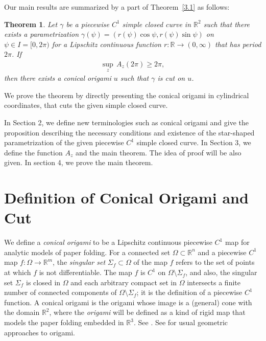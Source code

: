 \documentclass{amsart}
\theoremstyle{plain}
\newtheorem*{theorem*}{Theorem}
\theoremstyle{definition}
\theoremstyle{remark}
\begin{document}
Our main results are summarized by a part of Theorem~\ref{3.1} as follows:
\begin{theorem*} %
Let $\gamma$ be a piecewise $C^1$ simple closed curve in $\mathbb{R}^2$ such that there exists a parametrization $\gamma(\psi)=(r(\psi)\cos\psi,r(\psi)\sin\psi)$ on $\psi\in I=[0,2\pi)$ for a Lipschitz continuous function $r \colon \mathbb{R}\to(0,\infty)$ that has period $2\pi$. If
\begin{align}\label{condition}%
\sup_{z}\,A_z(2\pi)\ge2\pi,
\end{align}
then there exists a conical origami $u$ such that $\gamma$ is cut on $u$.
\end{theorem*}
\noindent We prove the theorem by directly presenting the conical origami in cylindrical coordinates, that cuts the given simple closed curve.

In Section 2, we define new terminologies such as conical origami and give the proposition describing the necessary conditions and existence of the star-shaped parametrization of the given piecewise $C^1$ simple closed curve.
In Section 3, we define the function $A_z$ and the main theorem.
The idea of proof will be also given.
In section 4, we prove the main theorem.






\bigskip

\section{Definition of Conical Origami and Cut}%
We define a \emph{conical origami} to be a Lipschitz continuous piecewise $C^1$ map for analytic models of paper folding.
For a connected set $\Omega\subset\mathbb{R}^n$ and a piecewise $C^1$ map $f\colon\Omega\to\mathbb{R}^m$, the \emph{singular set} $\Sigma_f\subset\Omega$ of the map $f$ refers to the set of points at which $f$ is not differentiable. %
The map $f$ is $C^1$ on $\Omega\setminus\Sigma_f$, and also, the singular set $\Sigma_f$ is closed in $\Omega$ and each arbitrary compact set in $\Omega$ intersects a finite number of connected components of $\Omega\setminus\Sigma_f$; it is the definition of a piecewise $C^1$ function. %
A conical origami is the origami whose image is a (general) cone with the domain $\mathbb{R}^2$, where the \emph{origami} will be defined as a kind of rigid map that models the paper folding embedded in $\mathbb{R}^3$. %
See \cite{dacorogna2008lipschitz}.
See \cite{arkin2004can,hull1994mathematics,kawasaki1989relation,lang1996computational}
for usual geometric approaches to origami. 
\end{document}

